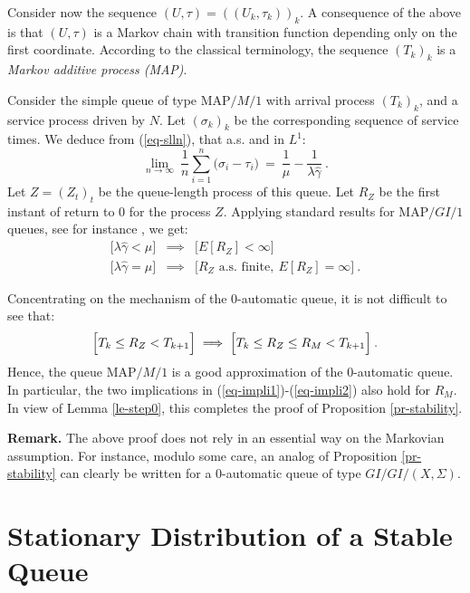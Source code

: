 \documentclass[11pt,a4paper]{article}
\theoremstyle{remark}
\def\eref#1{(\ref{#1})}
\begin{document}
\medskip

Consider now the sequence $(U,\tau)=((U_k,\tau_k))_k$. A consequence of the above
is that $(U,\tau)$ is a Markov chain with transition function
depending only on the first coordinate. According to the classical
terminology, the sequence $(T_k)_k$ is a {\em Markov additive
  process (MAP)}.

\medskip

Consider the simple queue of type $\text{MAP}/M/1$ with arrival process
$(T_k)_k$, and a service process driven by $N$.
Let $(\sigma_k)_k$ be the corresponding sequence of service times.
We deduce from \eref{eq-slln}, that a.s. and in $L^1$:
\[
\lim_{n\rightarrow \infty} \  \frac{1}{n}\sum_{i=1}^n \bigl( \sigma_i -
\tau_i\bigr)  \ = \ \frac{1}{\mu} -
\frac{1}{\lambda \widehat{\gamma}} \:.
\]
Let $Z=(Z_t)_{t}$ be the
queue-length process of this queue. Let $R_Z$ be the
first instant of return to 0 for the process $Z$.
Applying standard results for $\text{MAP}/GI/1$ queues, see for
instance \cite[Prop. 4.2, Chapter X]{asmu87}, we get:
\begin{eqnarray}
\bigl[ \lambda \widehat{\gamma} < \mu \bigr] & \implies & \bigl[ E[R_Z]<
  \infty \bigr]  \label{eq-impli1} \\
\bigl[ \lambda \widehat{\gamma} = \mu \bigr] & \implies & \bigl[ R_Z
  \text{ a.s. finite}, \ E[R_Z]=
  \infty \bigr] \:.\label{eq-impli2}
\end{eqnarray}

Concentrating on the mechanism of the 0-automatic queue, it is not difficult
to see that:
\begin{equation}\label{eq-ZM}
\Bigl[ T_k \leq R_Z < T_{k+1} \Bigr] \implies \Bigl[ T_k \leq
 R_Z \leq
  R_M < T_{k+1} \Bigr]\:.
\end{equation}
Hence, the queue $\text{MAP}/M/1$ is a good approximation of the 0-automatic
queue. In particular, the two implications in
\eref{eq-impli1}-\eref{eq-impli2}
also hold for $R_M$. In view of Lemma \ref{le-step0}, this completes the proof of Proposition
\ref{pr-stability}.


{\bf Remark.}
The above proof does not rely in an essential way on the Markovian
assumption. For instance, modulo some care,
an analog
of Proposition \ref{pr-stability} can clearly be written for a
0-automatic queue of type $GI/GI/(X,\Sigma)$.


\section{Stationary Distribution of a Stable Queue}\label{se-main}
\end{document}
